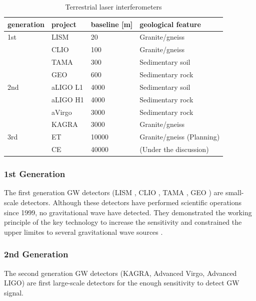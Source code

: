 \begin{table}[h] 
  \begin{center}
    \caption{Terrestrial laser interferometers \cite{chen2017brief,beker2013low}}\label{tb:tb101}
    \begin{tabular}{llll} 
      \hline
      generation &project & baseline [m] & geological feature \\ \hline \hline
      1st &LISM  & 20    & Granite/gneiss \\ 
      &CLIO  & 100   & Granite/gneiss \\
      &TAMA  & 300   & Sedimentary soil \cite{1970449}\\ 
      &GEO   & 600   & Sedimentary rock \\ \hline
      2nd &aLIGO L1 & 4000  & Sedimentary soil \\
      &aLIGO H1 & 4000  & Sedimentary rock \\
      &aVirgo   & 3000  & Sedimentary rock \\
      &KAGRA   & 3000  & Granite/gneiss \\ \hline
      3rd &ET      & 10000 & Granite/gneiss (Planning) \\
          &CE      & 40000 & (Under the discussion) \\
      \hline
    \end{tabular}
  \end{center}
\end{table}


\subsubsection{1st Generation}
The first generation GW detectors (LISM \cite{sato2004ultrastable}, CLIO \cite{ohashi2003design}, TAMA \cite{ando2001stable}, GEO \cite{grote2010geo}) are small-scale detectors. Although these detectors have performed scientific operations since 1999, no gravitational wave have detected. They demonstrated the working principle of the key technology to increase the sensitivity and constrained the upper limites to several gravitational wave sources \cite{takahashi2004coincidence,Fairhurst2011}.

\subsubsection{2nd Generation}
The second generation GW detectors (KAGRA\cite{akutsu2018kagra}, Advanced Virgo\cite{acernese2014advanced}, Advanced LIGO\cite{aasi2015advanced}) are first large-scale detectors for the enough sensitivity to detect GW signal.

